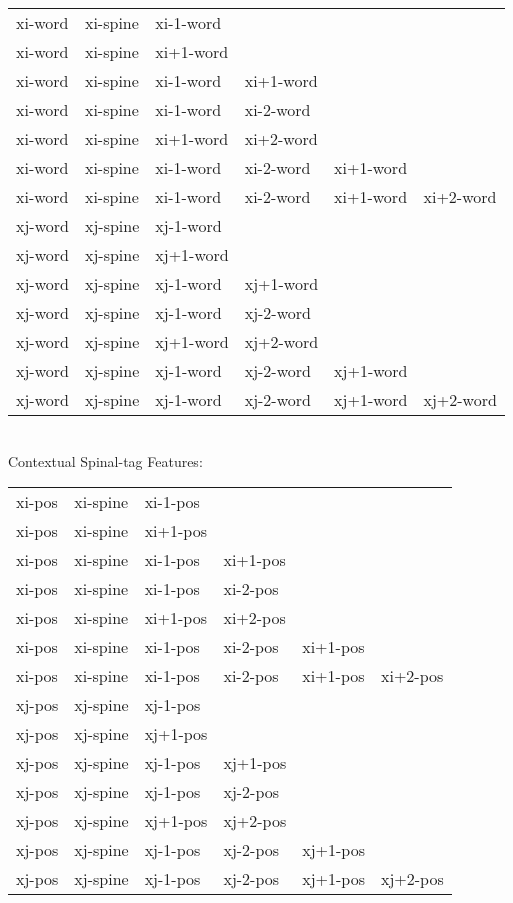 \documentclass[11pt]{article}
\begin{document}
\begin{tabular}{|l l l l l l|}
	\hline
    	xi-word& xi-spine& xi-1-word&&&\\
        xi-word& xi-spine& xi+1-word&&&\\
    	xi-word& xi-spine& xi-1-word& xi+1-word&&\\
        xi-word& xi-spine& xi-1-word& xi-2-word&&\\
        xi-word& xi-spine& xi+1-word& xi+2-word&&\\
        xi-word& xi-spine& xi-1-word& xi-2-word&xi+1-word&\\
    	xi-word& xi-spine& xi-1-word& xi-2-word&xi+1-word&xi+2-word\\
    	xj-word& xj-spine& xj-1-word&&&\\
        xj-word& xj-spine& xj+1-word&&&\\
    	xj-word& xj-spine& xj-1-word& xj+1-word&&\\
        xj-word& xj-spine& xj-1-word& xj-2-word&&\\
        xj-word& xj-spine& xj+1-word& xj+2-word&&\\
        xj-word& xj-spine& xj-1-word& xj-2-word&xj+1-word&\\
    	xj-word& xj-spine& xj-1-word& xj-2-word&xj+1-word&xj+2-word\\
	\hline
\end{tabular} \\

Contextual Spinal-tag Features: \\

\begin{tabular}{|l l l l l l|}
	\hline
    	xi-pos& xi-spine& xi-1-pos&&&\\
        xi-pos& xi-spine& xi+1-pos&&&\\
    	xi-pos& xi-spine& xi-1-pos& xi+1-pos&&\\
        xi-pos& xi-spine& xi-1-pos& xi-2-pos&&\\
        xi-pos& xi-spine& xi+1-pos& xi+2-pos&&\\
        xi-pos& xi-spine& xi-1-pos& xi-2-pos&xi+1-pos&\\
    	xi-pos& xi-spine& xi-1-pos& xi-2-pos&xi+1-pos&xi+2-pos\\
    	xj-pos& xj-spine& xj-1-pos&&&\\
        xj-pos& xj-spine& xj+1-pos&&&\\
    	xj-pos& xj-spine& xj-1-pos& xj+1-pos&&\\
        xj-pos& xj-spine& xj-1-pos& xj-2-pos&&\\
        xj-pos& xj-spine& xj+1-pos& xj+2-pos&&\\
        xj-pos& xj-spine& xj-1-pos& xj-2-pos&xj+1-pos&\\
    	xj-pos& xj-spine& xj-1-pos& xj-2-pos&xj+1-pos&xj+2-pos\\
	\hline
\end{tabular} \\
\end{document}
